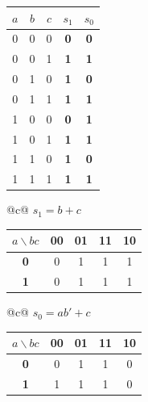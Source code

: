 \documentclass[12pt, a4paper]{article}
\begin{document}
\begin{center}
\renewcommand{\arraystretch}{1.25}
\begin{tabular}[t]{|ccc||cc|}
\hline
\colorbox{gray!25}{\color{black}$a$} & \colorbox{gray!25}{\color{black}$b$} & \colorbox{gray!25}{\color{black}$c$} & \colorbox{gray!25}{\color{black}$s_1$} & \colorbox{gray!25}{\color{black}$s_0$} \\ \hline
0 & 0 & 0 & \textbf{0} & \textbf{0} \\ \hline
0 & 0 & 1 & \textbf{1} & \textbf{1} \\ \hline
0 & 1 & 0 & \textbf{1} & \textbf{0} \\ \hline
0 & 1 & 1 & \textbf{1} & \textbf{1} \\ \hline
1 & 0 & 0 & \textbf{0} & \textbf{1} \\ \hline
1 & 0 & 1 & \textbf{1} & \textbf{1} \\ \hline
1 & 1 & 0 & \textbf{1} & \textbf{0} \\ \hline
1 & 1 & 1 & \textbf{1} & \textbf{1} \\ \hline
\end{tabular}
\end{center}
\begin{center}
\renewcommand{\arraystretch}{1.25}
\begin{tabular}[t]{@{}c@{}}
$s_1 = b + c$\\[3pt]
\begin{tabular}[t]{|c|c|c|c|c|}
\hline
\colorbox{gray!25}{\color{black}$a\backslash bc$} & \colorbox{gray!25}{\color{black}\textbf{00}} & \colorbox{gray!25}{\color{black}\textbf{01}} & \colorbox{gray!25}{\color{black}\textbf{11}} & \colorbox{gray!25}{\color{black}\textbf{10}} \\ \hline
\colorbox{gray!25}{\color{black}\textbf{0}} & 0 & 1 & 1 & 1 \\ \hline
\colorbox{gray!25}{\color{black}\textbf{1}} & 0 & 1 & 1 & 1 \\ \hline
\end{tabular}
\end{tabular}
\qquad
\begin{tabular}[t]{@{}c@{}}
$s_0 = ab' + c$\\[3pt]
\begin{tabular}[t]{|c|c|c|c|c|}
\hline
\colorbox{gray!25}{\color{black}$a\backslash bc$} & \colorbox{gray!25}{\color{black}\textbf{00}} & \colorbox{gray!25}{\color{black}\textbf{01}} & \colorbox{gray!25}{\color{black}\textbf{11}} & \colorbox{gray!25}{\color{black}\textbf{10}} \\ \hline
\colorbox{gray!25}{\color{black}\textbf{0}} & 0 & 1 & 1 & 0 \\ \hline
\colorbox{gray!25}{\color{black}\textbf{1}} & 1 & 1 & 1 & 0 \\ \hline
\end{tabular}
\end{tabular}
\end{center}
\end{document}
